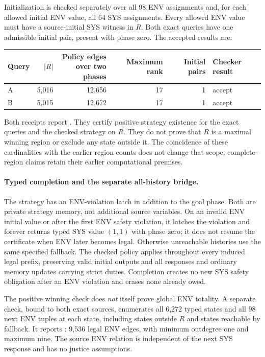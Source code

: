 Initialization is checked separately over all 98 ENV assignments and,
for each allowed initial ENV value, all 64 SYS assignments. Every
allowed ENV value must have a source-initial SYS witness in $R$.
Both exact queries have one admissible initial pair, present with
phase zero. The accepted results are:
\begin{center}\small
\begin{tabular}{@{}lrrrrl@{}}\toprule
Query & $|R|$ & \shortstack{Policy edges\\over two phases} &
Maximum rank & Initial pairs & Checker result\\\midrule
A & 5,016 & 12,656 & 17 & 1 & accept\\
B & 5,015 & 12,672 & 17 & 1 & accept\\\bottomrule
\end{tabular}
\end{center}
Both receipts report .
They certify positive strategy existence for the exact queries and
the checked strategy on $R$. They do not prove that $R$ is a maximal
winning region or exclude any state outside it. The coincidence of
these cardinalities with the earlier region counts does not change
that scope; complete-region claims retain their earlier computational
premises.

\paragraph{Typed completion and the separate all-history bridge.}
The strategy has an ENV-violation latch in addition to the goal phase.
Both are private strategy memory, not additional source variables.
On an invalid ENV initial value or after the first ENV safety violation,
it latches the violation and forever returns typed SYS value $(1,1)$
with phase zero; it does not resume the certificate when ENV later
becomes legal. Otherwise unreachable histories use the same specified
fallback. The checked policy applies throughout every induced legal
prefix, preserving valid initial outputs and all responses and ordinary
memory updates carrying strict duties. Completion creates no new
SYS safety obligation after an ENV violation and erases none already owed.

The positive winning check does \emph{not} itself prove global ENV
totality. A separate check, bound to both exact sources, enumerates all
6,272 typed states and all 98 next ENV tuples at each state, including
states outside $R$ and states reachable by fallback. It reports
: 9,536 legal ENV edges, with
minimum outdegree one and maximum nine. The source ENV relation is
independent of the next SYS response and has no justice assumptions.

